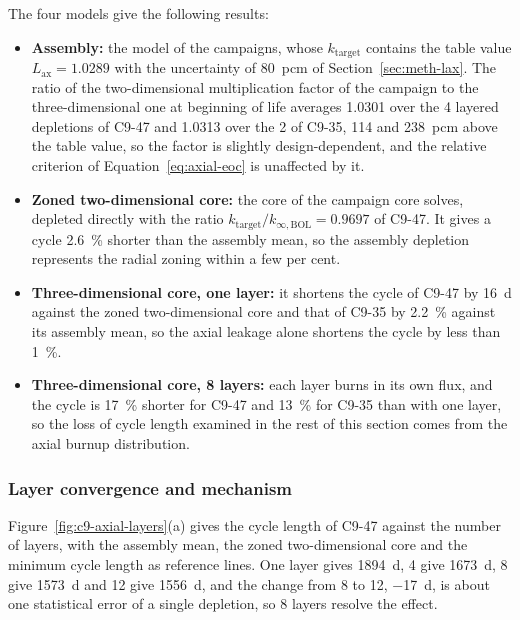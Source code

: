 The four models give the following results:

\begin{itemize}
  \item \textbf{Assembly:} the model of the campaigns, whose
        $k_\mathrm{target}$ contains the table value
        $L_\mathrm{ax} = 1.0289$ with the uncertainty of \SI{80}{pcm} of
        Section~\ref{sec:meth-lax}. The ratio of the two-dimensional
        multiplication factor of the campaign to the three-dimensional
        one at beginning of life averages 1.0301 over the 4 layered
        depletions of C9-47 and 1.0313 over the 2 of C9-35, 114 and
        \SI{238}{pcm} above the table value, so the factor is slightly
        design-dependent, and the relative criterion of
        Equation~\eqref{eq:axial-eoc} is unaffected by it.
  \item \textbf{Zoned two-dimensional core:} the core of the campaign
        core solves, depleted directly with the ratio
        $k_\mathrm{target}/k_{\infty,\mathrm{BOL}} = 0.9697$ of C9-47. It
        gives a cycle \SI{2.6}{\%} shorter than the assembly mean, so the
        assembly depletion represents the radial zoning within a few per
        cent.
  \item \textbf{Three-dimensional core, one layer:} it shortens the
        cycle of C9-47 by \SI{16}{d} against the zoned two-dimensional
        core and that of C9-35 by \SI{2.2}{\%} against its assembly
        mean, so the axial leakage alone shortens the cycle by less than
        \SI{1}{\%}.
  \item \textbf{Three-dimensional core, 8 layers:} each layer burns in
        its own flux, and the cycle is \SI{17}{\%} shorter for C9-47 and
        \SI{13}{\%} for C9-35 than with one layer, so the loss of cycle
        length examined in the rest of this section comes from the axial
        burnup distribution.
\end{itemize}

\subsubsection{Layer convergence and mechanism}
Figure~\ref{fig:c9-axial-layers}(a) gives the cycle length of C9-47
against the number of layers, with the assembly mean, the zoned
two-dimensional core and the minimum cycle length as reference lines.
One layer gives \SI{1894}{d}, 4 give \SI{1673}{d}, 8 give
\SI{1573}{d} and 12 give \SI{1556}{d}, and the change from 8 to 12, \SI{-17}{d}, is about one statistical error of a single
depletion, so 8 layers resolve the effect.

